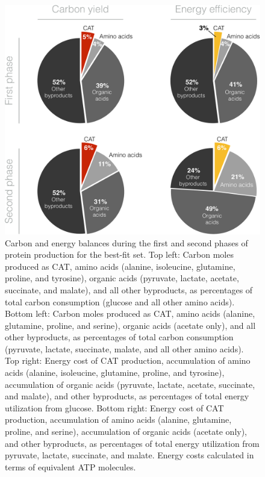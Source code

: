 \documentclass[12pt]{article}
\begin{document}
\begin{figure}[ht]
\centering
\includegraphics[width=1.00\textwidth]{./Figures/Fig_6_CarbonEnergyBalances.pdf}
\caption{Carbon and energy balances during the first and second phases of protein production for the best-fit set. Top left: Carbon moles produced as CAT, amino acids (alanine, isoleucine, glutamine, proline, and tyrosine), organic acids (pyruvate, lactate, acetate, succinate, and malate), and all other byproducts, as percentages of total carbon consumption (glucose and all other amino acids). Bottom left: Carbon moles produced as CAT, amino acids (alanine, glutamine, proline, and serine), organic acids (acetate only), and all other byproducts, as percentages of total carbon consumption (pyruvate, lactate, succinate, malate, and all other amino acids). Top right: Energy cost of CAT production, accumulation of amino acids (alanine, isoleucine, glutamine, proline, and tyrosine), accumulation of organic acids (pyruvate, lactate, acetate, succinate, and malate), and other byproducts, as percentages of total energy utilization from glucose. Bottom right: Energy cost of CAT production, accumulation of amino acids (alanine, glutamine, proline, and serine), accumulation of organic acids (acetate only), and other byproducts, as percentages of total energy utilization from pyruvate, lactate, succinate, and malate. Energy costs calculated in terms of equivalent ATP molecules.}
\label{fig:CAT_balances}
\end{figure}
\end{document}
